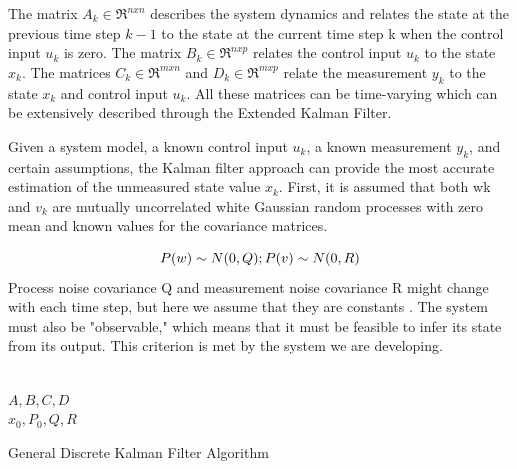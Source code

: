 The matrix $A_k \in \mathfrak{R}^{nxn}$ describes the system dynamics and
relates the state at the previous time step $k-1$ to the state at
the current time step k when the control input $u_k$ is zero. The
matrix $B_k \in \mathfrak{R}^{nxp}$ relates the control input $u_k$ to the state $x_k$.
The matrices $C_k \in \mathfrak{R}^{mxn}$ and $D_k \in\mathfrak{R}^{mxp}$ relate the measurement
$y_k$ to the state $x_k$ and control input $u_k$. All these matrices can be time-varying which can be extensively described through the Extended Kalman Filter.

Given a system model, a known control input $u_k$, a known measurement $y_k$, and certain assumptions, the Kalman filter approach can provide the most accurate estimation of the unmeasured state value $x_k$.
First, it is assumed that both wk and $v_k$ are mutually uncorrelated white Gaussian random processes with zero mean and known values for the covariance matrices.

\begin{equation}\label{eq:Discrete_Noise_Covariance}
    P(w) \sim N(0,Q) ; \\
    P(v) \sim N(0,R) \\
\end{equation}
Process noise covariance Q and measurement noise covariance R might change with each time step, but here we assume that they are constants  \cite{SOC_Estimation_KalmanFilter_Ahmad}.
The system must also be "observable," which means that it must be feasible to infer its state from its output. This criterion is met by the system we are developing.

\begin{algorithm}[H]\label{algo:PowerAnalyzer_Modeling}
    \DontPrintSemicolon
    \SetAlgoLined
    
    \\
    $A, B, C, D$\\
    $x_0, P_0, Q, R$ \\
    \caption{General Discrete Kalman Filter Algorithm}
\end{algorithm}

